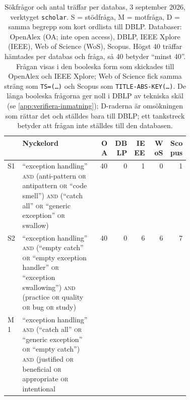 \begin{table}[htbp]
  \centering
  \caption{Sökfrågor och antal träffar per databas, 3
    september 2026, verktyget \texttt{scholar}.  S = stödfråga,
    M = motfråga, D = samma begrepp som kort ordlista till DBLP.
    Databaser: OpenAlex (OA; inte \foreignlanguage{english}{open
    access}), DBLP, IEEE Xplore (IEEE), Web of Science (WoS), Scopus.
    Högst 40 träffar hämtades per databas och fråga, så 40 betyder
    \enquote{minst 40}.  Frågan visas i den booleska form som skickades
    till OpenAlex och IEEE Xplore; Web of Science fick samma sträng som
    \texttt{TS=(\dots)} och Scopus som
    \texttt{TITLE-ABS-KEY(\dots)}.  De långa booleska frågorna ger noll
    i DBLP av tekniska skäl (se \cref{app:verifiera-inmatning}); D-raderna är
    omsökningen som rättar det och ställdes bara till DBLP; ett
    tankstreck betyder att frågan inte ställdes till den
    databasen.}
  \label{tab:ca-queries}
  \footnotesize
  \begin{tabular}{@{}lp{0.42\linewidth}rrrrr@{}}
    \toprule
    & Nyckelord & OA & DBLP & IEEE & WoS & Scopus \\
    \midrule
    S1 & \enquote{exception handling} \textsc{and} (anti-pattern
      \textsc{or} antipattern \textsc{or} \enquote{code smell})
      \textsc{and} (\enquote{catch all} \textsc{or} \enquote{generic
      exception} \textsc{or} swallow)
      & 40 & 0 & 1 & 0 & 1 \\
    S2 & \enquote{exception handling} \textsc{and} (\enquote{empty
      catch} \textsc{or} \enquote{empty exception handler} \textsc{or}
      \enquote{exception swallowing}) \textsc{and} (practice
      \textsc{or} quality \textsc{or} bug \textsc{or} study)
      & 40 & 0 & 6 & 6 & 7 \\
    M1 & \enquote{exception handling} \textsc{and} (\enquote{catch
      all} \textsc{or} \enquote{generic exception} \textsc{or}
      \enquote{empty catch}) \textsc{and} (justified \textsc{or}
      beneficial \textsc{or} appropriate \textsc{or} intentional

\end{tabular}
\end{table}
